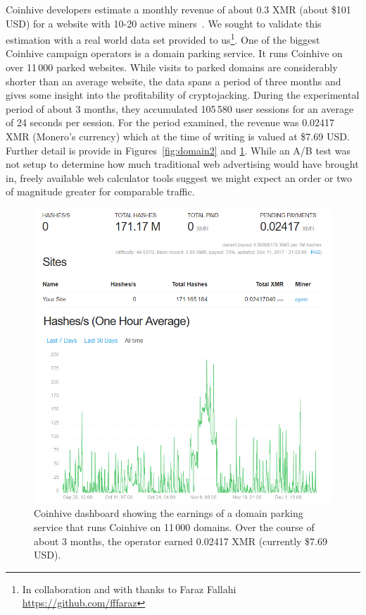 Coinhive developers estimate a monthly revenue of about 0.3 XMR (about \$101 USD) for a website with 10-20 active miners~\cite{coinhive}. We sought to validate this estimation with a real world data set provided to us\footnote{In collaboration and with thanks to Faraz Fallahi \url{https://github.com/fffaraz}}. One of the biggest Coinhive campaign operators is a domain parking service. It runs Coinhive on over 11\,000 parked websites. While visits to parked domains are considerably shorter than an average website, the data spans a period of three months and gives some insight into the profitability of cryptojacking. During the experimental period of about 3 months, they accumulated 105\,580 user sessions for an average of 24 seconds per session. For the period examined, the revenue was 0.02417 XMR (Monero's currency) which at the time of writing is valued at \$7.69 USD. Further detail is provide in Figures~\ref{fig:domain2} and \ref{fig:domain1}. While an A/B test was not setup to determine how much traditional web advertising would have brought in, freely available web calculator tools suggest we might expect an order or two of magnitude greater for comparable traffic. 

\begin{figure}[t]
\centering
\includegraphics[width=\linewidth]{figures/experiment_coinhive_results.png}
\caption{Coinhive dashboard showing the earnings of a domain parking service that runs Coinhive on 11\,000 domains. Over the course of about 3 months, the operator earned 0.02417 XMR (currently \$7.69 USD).}\label{fig:domain1}
\end{figure}


